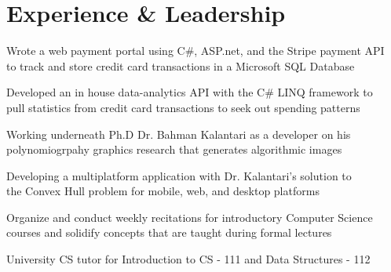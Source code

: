 \documentclass[]{deedy-resume-openfont}
\begin{document}
\hfill
\begin{minipage}[t]{0.66\textwidth} 


\section{Experience \& Leadership}

\vspace{\topsep} 
\begin{tightemize}
\item Wrote a web payment portal using C\#, ASP.net, and the Stripe payment API \\to track and store credit card transactions in a Microsoft SQL Database
\item Developed an in house data-analytics API with the C\# LINQ framework to \\pull statistics from credit card transactions to seek out spending patterns
\end{tightemize}
\sectionsep

\begin{tightemize}
\item Working underneath Ph.D Dr. Bahman Kalantari as a developer on his polynomiogrpahy graphics research that generates algorithmic images  
\item Developing a multiplatform application with Dr. Kalantari's solution to \\the Convex Hull problem for mobile, web, and desktop platforms
\end{tightemize}
\sectionsep

\begin{tightemize}
\item Organize and conduct weekly recitations for introductory Computer Science courses and solidify concepts that are taught during formal lectures
\item University CS tutor for Introduction to CS - 111 and Data Structures - 112
\end{tightemize}
\sectionsep


\end{minipage}
\end{document}
